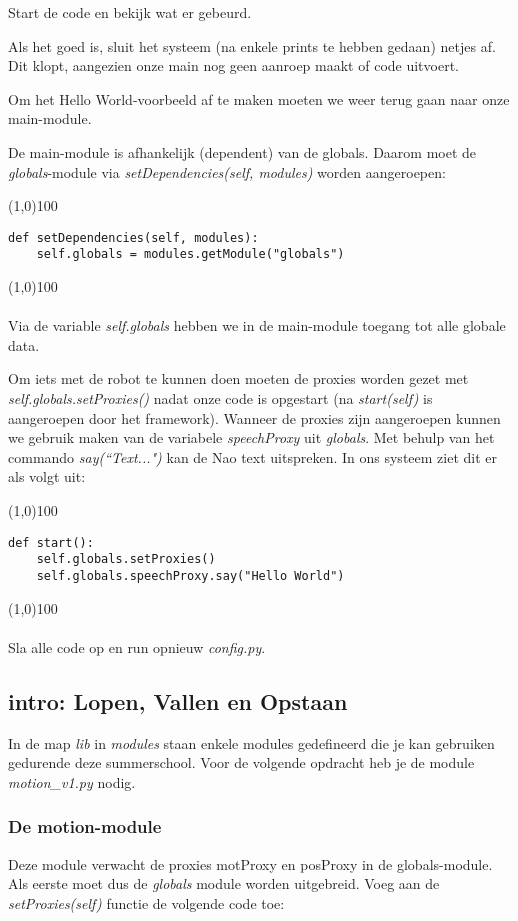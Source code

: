 \documentclass[a4paper]{article}
\begin{document}
Start de code en bekijk wat er gebeurd.

Als het goed is, sluit het systeem (na enkele prints te hebben gedaan) netjes af. Dit klopt, aangezien onze main nog geen aanroep maakt of code uitvoert.

Om het Hello World-voorbeeld af te maken moeten we weer terug gaan naar onze main-module.

De main-module is afhankelijk (dependent) van de globals. Daarom moet de \textit{globals}-module via \textit{setDependencies(self, modules)} worden aangeroepen:

\noindent \line(1,0){100}
\begin{verbatim}
def setDependencies(self, modules):
    self.globals = modules.getModule("globals")
\end{verbatim}
\noindent \line(1,0){100}
\\\\
Via de variable \textit{self.globals} hebben we in de main-module toegang tot alle globale data.

Om iets met de robot te kunnen doen moeten de proxies worden gezet met \textit{self.globals.setProxies()} nadat onze code is opgestart (na \textit{start(self)} is aangeroepen door het framework).
Wanneer de proxies zijn aangeroepen kunnen we gebruik maken van de variabele \textit{speechProxy} uit \textit{globals}.
Met behulp van het commando \textit{say(``Text...")} kan de Nao text uitspreken. In ons systeem ziet dit er als volgt uit:

\noindent \line(1,0){100}
\begin{verbatim}
def start():
    self.globals.setProxies()
    self.globals.speechProxy.say("Hello World")
\end{verbatim}
\noindent \line(1,0){100}
\\\\
Sla alle code op en run opnieuw \textit{config.py}.

\subsection{intro: Lopen, Vallen en Opstaan}
In de map \textit{lib} in \textit{modules} staan enkele modules gedefineerd die je kan gebruiken gedurende deze summerschool.
Voor de volgende opdracht heb je de module \textit{motion\_v1.py} nodig.

\subsubsection{De motion-module}
Deze module verwacht de proxies motProxy en posProxy in de globals-module. Als eerste moet dus de \textit{globals} module worden uitgebreid.
Voeg aan de \textit{setProxies(self)} functie de volgende code toe:
\end{document}
